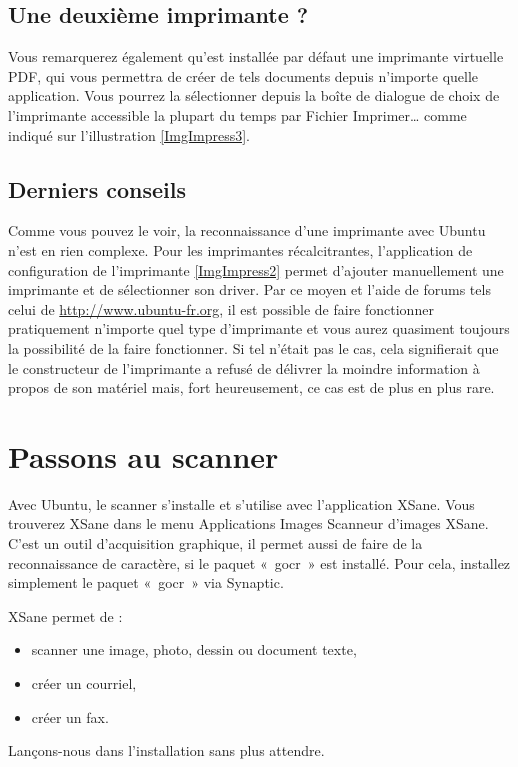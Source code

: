 \subsection{Une deuxième imprimante ?}
Vous remarquerez également qu'est installée par défaut une imprimante virtuelle PDF, qui vous permettra de créer de tels documents depuis n'importe quelle application. Vous pourrez la sélectionner depuis la boîte de dialogue de choix de l'imprimante accessible la plupart du temps par Fichier \FlecheDroite Imprimer\dots{} comme indiqué sur l'illustration \ref{ImgImpress3}.\par
{}
\subsection{Derniers conseils}
Comme vous pouvez le voir, la reconnaissance d'une imprimante avec Ubuntu n'est en rien complexe. Pour les imprimantes récalcitrantes, l'application de configuration de l'imprimante \ref{ImgImpress2} permet d'ajouter manuellement une imprimante et de sélectionner son driver. Par ce moyen et l'aide de forums tels celui de \url{http://www.ubuntu-fr.org}, il est possible de faire fonctionner pratiquement n'importe quel type d'imprimante et vous aurez quasiment toujours la possibilité de la faire fonctionner. Si tel n'était pas le cas, cela signifierait que le constructeur de l'imprimante a refusé de délivrer la moindre information à propos de son matériel mais, fort heureusement, ce cas est de plus en plus rare.
\section{Passons au scanner}
Avec Ubuntu, le scanner s'installe et s'utilise avec l'application XSane. Vous trouverez XSane dans le menu  Applications \FlecheDroite Images \FlecheDroite Scanneur d'images XSane. C'est un outil d'acquisition graphique, il permet aussi de faire de la reconnaissance de caractère, si le paquet «~gocr~» est installé. Pour cela, installez simplement le paquet «~gocr~» via Synaptic.\par
XSane permet de :
\begin{itemize}
\item scanner une image, photo, dessin ou document texte, 
\item créer un courriel, 
\item créer un fax. 
\end{itemize}
Lançons-nous dans l'installation sans plus attendre.
